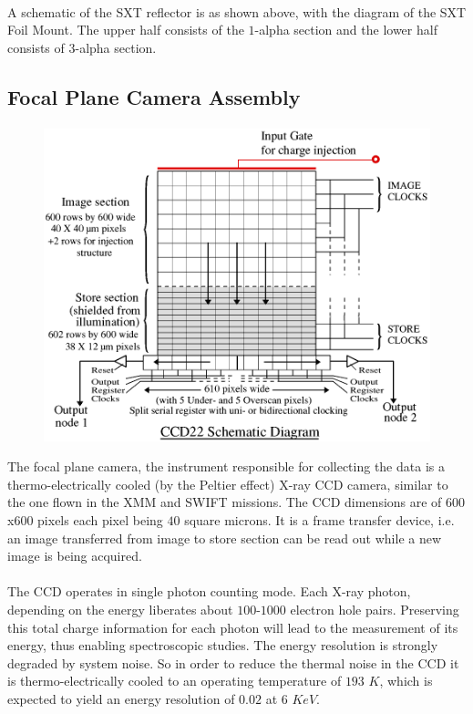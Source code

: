 \documentclass[a4paper,twoside]{report}
\numberwithin{equation}{section}
\begin{document}
\paragraph{}
A schematic of the SXT reflector is as shown above, with the diagram of the SXT Foil Mount. The upper half consists of the $1$-alpha section and the lower half consists of $3$-alpha section.
\subsection{Focal Plane Camera Assembly}
\paragraph{}
\begin{figure}
\includegraphics[width=1.0\linewidth]{CCD22.png} 
\caption{}
\label{fig:CCDSD}
\end{figure}
The focal plane camera, the instrument responsible for collecting the data is a thermo-electrically cooled (by the Peltier effect) X-ray CCD camera, similar to the one flown in the XMM and SWIFT missions. The CCD dimensions are of $600$x$600$ pixels each pixel being $40$ square microns. It is a frame transfer device, i.e. an image transferred from image to store section can be read out while a new image is being acquired. 
\paragraph{}
The CCD operates in single photon counting mode. Each X-ray photon, depending on the energy liberates about $100$-$1000$ electron hole pairs. Preserving this total charge information for each photon will lead to the measurement of its energy, thus enabling spectroscopic studies. The energy resolution is strongly degraded by system noise. So in order to reduce the thermal noise in the CCD it is thermo-electrically cooled to an operating temperature of $193$ $K$, which is expected to yield an energy resolution of $0.02$ at $6$ $KeV$.
\end{document}

